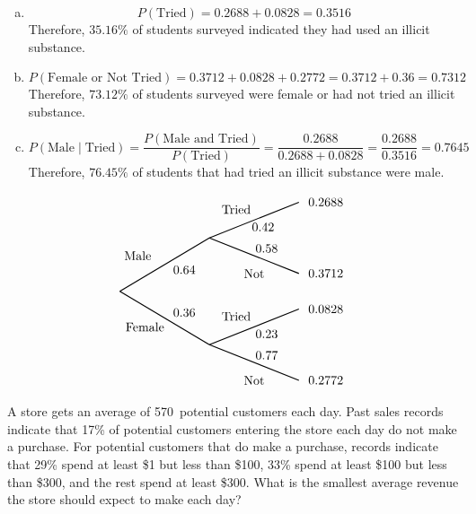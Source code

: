 \documentclass[12pt,letterpaper]{exam}
\begin{document}
\begin{questions}
\sol 
\begin{enumerate}[(a)]
\item 
	\[
	P(\text{Tried})= 0.2688 + 0.0828= 0.3516
	\] 
Therefore, $35.16\%$ of students surveyed indicated they had used an illicit substance. \pspace

\item 
	\[
	P(\text{Female or Not Tried})= 0.3712 + 0.0828 + 0.2772= 0.3712 + 0.36= 0.7312
	\]
Therefore, $73.12\%$ of students surveyed were female or had not tried an illicit substance. \pspace

\item 
	\[
	P(\text{Male} \;|\; \text{Tried})= \dfrac{P(\text{Male and Tried})}{P(\text{Tried})}= \dfrac{0.2688}{0.2688 + 0.0828}= \dfrac{0.2688}{0.3516}= 0.7645
	\]
Therefore, $76.45\%$ of students that had tried an illicit substance were male.
\end{enumerate} \vfill

		\[
		\begin{tikzpicture}[scale= 1.0]
		\def\FirstUpLabel{Male}
		\def\FirstDownLabel{Female}
		\def\SecondUpLabel{Tried}
		\def\SecondDownLabel{Not}
		\def\Up{$0.64$}
		\def\Down{$0.36$}
		\def\UpUp{$0.42$}
		\def\UpDown{$0.58$}
		\def\DownUp{$0.23$}
		\def\DownDown{$0.77$}
		\def\first{$0.2688$}
		\def\second{$0.3712$}
		\def\third{$0.0828$}
		\def\fourth{$0.2772$}
		
		\node at (0.5,1) {\FirstUpLabel};	
		\node at (0.7,-1) {\FirstDownLabel};	
		\node at (1.8,0.6) {\Up};
		\node at (1.8,-0.6) {\Down};
		\draw[thick] (0,0) -- (2.5,1.5);
		\draw[thick] (0,0) -- (2.5,-1.5);
		
		\node at (3.25,2.3) {\SecondUpLabel};
		\node at (3.75,0.5) {\SecondDownLabel};
		\node at (4,1.8) {\UpUp};
		\node at (4.1,1.2) {\UpDown};
		\node at (5.75,2.5) {\first};
		\node at (5.75,0.5) {\second};
		\draw[thick] (2.5,1.5) -- (5,2.5);
		\draw[thick] (2.5,1.5) -- (5,0.5);

		\node at (3.25,-0.7) {\SecondUpLabel};
		\node at (3.75,-2.5) {\SecondDownLabel};
		\node at (4.1,-1.2) {\DownUp};
		\node at (4.1,-1.8) {\DownDown};
		\node at (5.75,-0.5) {\third};	
		\node at (5.75,-2.5) {\fourth};	
		\draw[thick] (2.5,-1.5) -- (5,-0.5);
		\draw[thick] (2.5,-1.5) -- (5,-2.5);
		\end{tikzpicture}
		\]



\newpage
\question[10] A store gets an average of 570~potential customers each day. Past sales records indicate that 17\% of potential customers entering the store each day do not make a purchase. For potential customers that do make a purchase, records indicate that 29\% spend at least \$1 but less than \$100, 33\% spend at least \$100 but less than \$300, and the rest spend at least \$300. What is the smallest average revenue the store should expect to make each day? \pspace


\end{questions}
\end{document}
